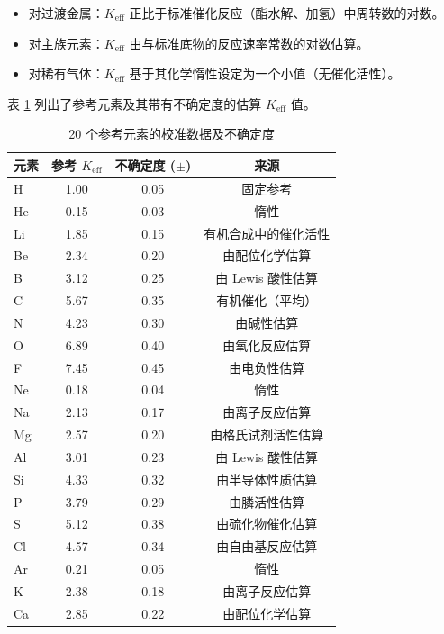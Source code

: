 \documentclass[11pt,a4paper]{article}
\newcommand{\Keff}{K_{\mathrm{eff}}}
\begin{document}
	\begin{itemize}
		\item 对过渡金属：$\Keff$ 正比于标准催化反应（酯水解、加氢）中周转数的对数。
		\item 对主族元素：$\Keff$ 由与标准底物的反应速率常数的对数估算。
		\item 对稀有气体：$\Keff$ 基于其化学惰性设定为一个小值（无催化活性）。
	\end{itemize}
	
	表 \ref{tab:calibration} 列出了参考元素及其带有不确定度的估算 $\Keff$ 值。
	
	\begin{table}[htbp]
		\centering
		\caption{20 个参考元素的校准数据及不确定度}
		\label{tab:calibration}
		\begin{tabular}{lccc}
			\toprule
			元素 & 参考 $\Keff$ & 不确定度 ($\pm$) & 来源 \\
			\midrule
			H  & 1.00 & 0.05 & 固定参考 \\
			He & 0.15 & 0.03 & 惰性 \\
			Li & 1.85 & 0.15 & 有机合成中的催化活性 \\
			Be & 2.34 & 0.20 & 由配位化学估算 \\
			B  & 3.12 & 0.25 & 由 Lewis 酸性估算 \\
			C  & 5.67 & 0.35 & 有机催化（平均） \\
			N  & 4.23 & 0.30 & 由碱性估算 \\
			O  & 6.89 & 0.40 & 由氧化反应估算 \\
			F  & 7.45 & 0.45 & 由电负性估算 \\
			Ne & 0.18 & 0.04 & 惰性 \\
			Na & 2.13 & 0.17 & 由离子反应估算 \\
			Mg & 2.57 & 0.20 & 由格氏试剂活性估算 \\
			Al & 3.01 & 0.23 & 由 Lewis 酸性估算 \\
			Si & 4.33 & 0.32 & 由半导体性质估算 \\
			P  & 3.79 & 0.29 & 由膦活性估算 \\
			S  & 5.12 & 0.38 & 由硫化物催化估算 \\
			Cl & 4.57 & 0.34 & 由自由基反应估算 \\
			Ar & 0.21 & 0.05 & 惰性 \\
			K  & 2.38 & 0.18 & 由离子反应估算 \\
			Ca & 2.85 & 0.22 & 由配位化学估算 \\
			\bottomrule
		\end{tabular}
	\end{table}
	
\end{document}
